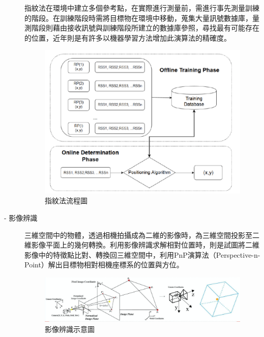 \begin{description}
        \qquad
        指紋法在環境中建立多個參考點，在實際進行測量前，需進行事先測量訓練的階段。在訓練階段時需將目標物在環境中移動，蒐集大量訊號數據庫，量測階段則藉由接收訊號與訓練階段所建立的數據庫參照，尋找最有可能存在的位置，近年則是有許多以機器學習方法增加此演算法的精確度。
        \begin{figure}[ht]
            \centering
            \includegraphics[width=13cm]{ch2pic/fingerprinting.png}
            \caption{指紋法流程圖\cite{pic:fingerprinting}}
            \label{pic:fingerprinting}
        \end{figure}
        
        \item[- 影像辨識]\hfill 
        
        \qquad
        三維空間中的物體，透過相機拍攝成為二維的影像時，為三維空間投影至二維影像平面上的幾何轉換。利用影像辨識求解相對位置時，則是試圖將二維影像中的特徵點比對、轉換回三維空間中，利用PnP演算法（Perspective-n-Point）解出目標物相對相機座標系的位置與方位。
        
        \begin{figure}[ht]
            \centering
            \includegraphics[width=15cm]{ch2pic/image_processing.png}
            \caption{影像辨識示意圖\cite{pic:image_processing}}
            \label{pic:image_processing}
        \end{figure}
        

\end{description}

